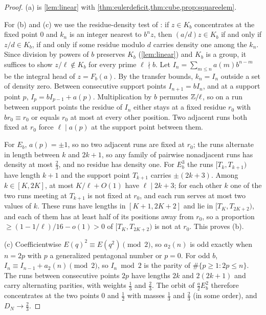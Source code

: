 \documentclass[11pt]{article}
\newcommand{\cnt}{\#}
\begin{document}
\begin{proof}
(a) is \cref{lem:linear} with \cref{thm:eulerdeficit,thm:cube,prop:squareelem}.

For (b) and (c) we use the residue-density test of \cite{DiscrepancyCompanion}: if $z\in K_b$
concentrates at the fixed point $0$ and $k_n$ is an integer nearest to $b^nz$, then
$(a/d)z\in K_b$ if and only if $z/d\in K_b$, if and only if some residue modulo $d$ carries
density one among the $k_n$. Since division by powers of $b$ preserves $K_b$
(\cref{lem:linear}) and $K_b$ is a group, it suffices to show $z/\ell\notin K_b$ for every
prime $\ell\nmid b$. Let $I_n=\sum_{m\le n}a(m)b^{n-m}$ be the integral head of
$z=F_b(a)$. By the transfer bounds, $k_n=I_n$ outside a set of density zero. Between
consecutive support points $I_{n+1}=bI_n$, and at a support point $p$,
$I_p=bI_{p-1}+a(p)$. Multiplication by $b$ permutes $\mathbb Z/\ell$, so on a run between support
points the residue of $I_n$ either stays at a fixed residue $r_0$ with $br_0\equiv r_0$ or
equals $r_0$ at most at every other position. Two adjacent runs both fixed at $r_0$ force
$\ell\mid a(p)$ at the support point between them.

For $E_b$, $a(p)=\pm1$, so no two adjacent runs are fixed at $r_0$; the runs alternate in
length between $k$ and $2k+1$, so any family of pairwise nonadjacent runs has density at most
$\frac23$, and no residue has density one. For $E_b^3$ the runs $[T_k,T_{k+1})$ have length
$k+1$ and the support point $T_{k+1}$ carries $\pm(2k+3)$. Among $k\in[K,2K]$, at most
$K/\ell+O(1)$ have $\ell\mid2k+3$; for each other $k$ one of the two runs meeting at
$T_{k+1}$ is not fixed at $r_0$, and each run serves at most two values of $k$. These runs
have lengths in $[K+1,2K+2]$ and lie in $[T_K,T_{2K+2})$, and each of them has at least
half of its positions away from $r_0$, so a proportion $\ge(1-1/\ell)/16-o(1)>0$ of
$[T_K,T_{2K+2})$ is not at $r_0$. This proves (b).

(c) Coefficientwise $E(q)^2\equiv E(q^2)\pmod2$, so $a_2(n)$ is odd exactly when $n=2p$ with $p$
a generalized pentagonal number or $p=0$. For odd $b$, $I_n\equiv I_{n-1}+a_2(n)\pmod2$, so
$I_n\bmod 2$ is the parity of $\cnt\{p\ge1:2p\le n\}$. The runs between consecutive points
$2p$ have lengths $2k$ and $2(2k+1)$ and carry alternating parities, with weights $\frac13$
and $\frac23$. The orbit of $\frac a2E_b^2$ therefore concentrates at the two points $0$ and
$\frac12$ with masses $\frac13$ and $\frac23$ (in some order), and $D_N\to\frac23$.
\end{proof}
\end{document}
